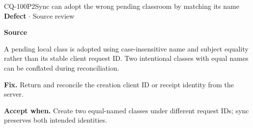 \begin{finding}{CQ-100}{P2}{Sync can adopt the wrong pending classroom by matching its name}
\textbf{Defect} $\cdot$ Source review\par
\textbf{Source}\quad{}\par
A pending local class is adopted using case-insensitive name and subject equality rather than its stable client request ID. Two intentional classes with equal names can be conflated during reconciliation.\par
\textbf{Fix.} Return and reconcile the creation client ID or receipt identity from the server.\par
\textbf{Accept when.} Create two equal-named classes under different request IDs; sync preserves both intended identities.
\end{finding}
\clearpage
